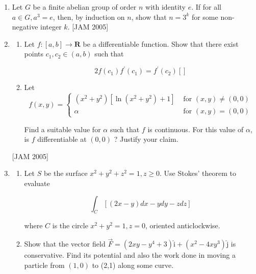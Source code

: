 \begin{enumerate}
\begin{enumerate}
    $$
        \left(2 y \sin x+3 y^{4} \sin x \cos x\right) d x-\left(4 y^{3} \cos ^{2} x+\cos x\right) d y=0
    $$

 \end{enumerate}
  \hfill [JAM 2005]



\item  Let $G$ be a finite abelian group of order $n$ with identity $e$. If for all $a \in G, a^{3}=e$, then, by induction on $n$, show that $n=3^{k}$ for some non-negative integer $k$. 
 \hfill [JAM 2005]

\item 
\begin{enumerate}
   \item Let $f:[a, b] \longrightarrow \boldsymbol{R}$ be a differentiable function. Show that there exist points $c_{1}, c_{2} \in(a, b)$ such that

    $$
        2 f\left(c_{1}\right) f^{\prime}\left(c_{1}\right)=f^{\prime}\left(c_{2}\right)[]
    $$

    \item Let
    $$
        f(x, y)= \begin{cases}\left(x^{2}+y^{2}\right)\left[\ln \left(x^{2}+y^{2}\right)+1\right] & \text { for }(x, y) \neq(0,0) \\ \alpha & \text { for }(x, y)=(0,0)\end{cases}
    $$

    Find a suitable value for $\alpha$ such that $f$ is continuous. For this value of $\alpha$, is $f$ differentiable at $(0,0)$ ? Justify your claim. 

\end{enumerate}
 \hfill [JAM 2005]


 
\item 
\begin{enumerate}
    \item Let $S$ be the surface $x^{2}+y^{2}+z^{2}=1, z \geq 0$. Use Stokes' theorem to evaluate

        $$
            \int_{C}[(2 x-y) d x-y d y-z d z]
        $$

    where $C$ is the circle $x^{2}+y^{2}=1, z=0$, oriented anticlockwise.

    \item  Show that the vector field $\vec{F}=\left(2 x y-y^{4}+3\right) \hat{\mathrm{i}}+\left(x^{2}-4 x y^{3}\right) \hat{\mathrm{j}}$ is conservative. Find its potential and also the work done in moving a particle from $(1,0)$ to (2,1) along some curve. 


\end{enumerate}
\end{enumerate}
